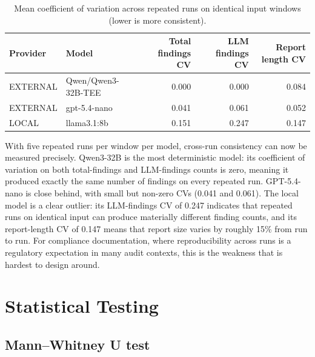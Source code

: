 \documentclass[]{UCD_CS_FYP_Report}
\begin{document}
\begin{table}[!ht]
    \centering
    {\footnotesize
        \begin{tabular}{|l|l|r|r|r|}
        \hline
            \textbf{Provider} & \textbf{Model} & \textbf{Total findings CV} & \textbf{LLM findings CV} & \textbf{Report length CV} \\ \hline
            EXTERNAL & Qwen/Qwen3-32B-TEE & 0.000 & 0.000 & 0.084 \\ \hline
            EXTERNAL & gpt-5.4-nano       & 0.041 & 0.061 & 0.052 \\ \hline
            LOCAL    & llama3.1:8b        & 0.151 & 0.247 & 0.147 \\ \hline
        \end{tabular}
    }
    \caption{Mean coefficient of variation across repeated runs on identical input windows (lower is more consistent).}
    \label{tab:consistency}
\end{table}
 
With five repeated runs per window per model, cross-run consistency can now be measured precisely. Qwen3-32B is the most deterministic model: its coefficient of variation on both total-findings and LLM-findings counts is zero, meaning it produced exactly the same number of findings on every repeated run. GPT-5.4-nano is close behind, with small but non-zero CVs (0.041 and 0.061). The local model is a clear outlier: its LLM-findings CV of 0.247 indicates that repeated runs on identical input can produce materially different finding counts, and its report-length CV of 0.147 means that report size varies by roughly 15\% from run to run. For compliance documentation, where reproducibility across runs is a regulatory expectation in many audit contexts, this is the weakness that is hardest to design around.
 
\section{Statistical Testing}
\label{sec:results_statistical_testing}
 
\subsection{Mann--Whitney U test}
 
\end{document}
